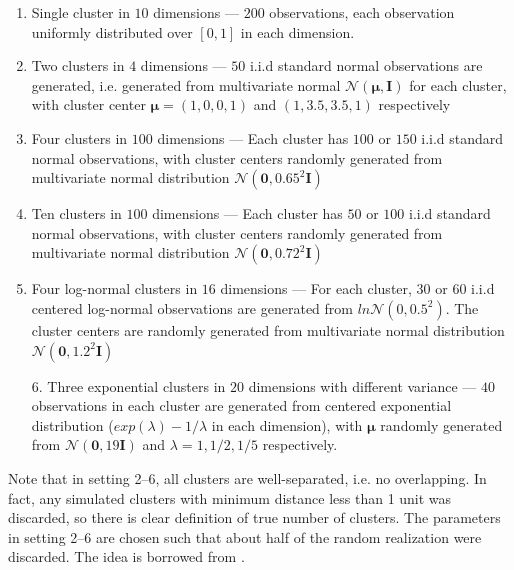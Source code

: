 \documentclass[11pt]{article}
\begin{document}
\begin{enumerate}

  \item Single cluster in $10$ dimensions --- $200$ observations, each
    observation uniformly distributed over $[0,1]$ in each dimension. 

  \item Two clusters in $4$ dimensions --- $50$ i.i.d standard normal
    observations are generated, i.e. generated from multivariate normal
    $\mathcal{N}\left(\boldsymbol\mu,\mathbf{I}\right)$ for each cluster, with
    cluster center $\boldsymbol\mu = (1,0,0,1)$ and $(1,3.5,3.5,1)$
    respectively  

  \item Four clusters in $100$ dimensions ---  Each cluster has $100$ or $150$
    i.i.d standard normal observations, with cluster centers randomly
    generated from multivariate normal distribution
    $\mathcal{N}\left(\mathbf{0},0.65^2\mathbf{I}\right)$

  \item Ten clusters in $100$ dimensions ---  Each cluster has $50$ or $100$
    i.i.d standard normal observations, with cluster centers randomly
    generated from multivariate normal distribution
    $\mathcal{N}\left(\mathbf{0},0.72^2\mathbf{I}\right)$

  \item Four log-normal clusters in $16$ dimensions --- For each cluster, $30$
    or $60$ i.i.d centered log-normal observations are generated from
    $ln\mathcal{N}\left(0,0.5^2 \right)$. The cluster centers are randomly
    generated from multivariate normal distribution
    $\mathcal{N}\left(\mathbf{0},1.2^2\mathbf{I}\right)$

  \item[6.] Three exponential clusters in $20$ dimensions with different
    variance --- $40$ observations in each cluster are generated from centered
    exponential distribution ($exp(\lambda)-1/\lambda$ in each dimension),
    with $\boldsymbol\mu$ randomly generated from
    $\mathcal{N}\left(\mathbf{0},19\mathbf{I}\right)$ and $\lambda = 1, 1/2,
    1/5$ respectively.
\end{enumerate}
Note that in setting 2--6, all clusters are well-separated, i.e. no
overlapping. In fact, any simulated clusters with minimum distance less than
1 unit was discarded, so there is clear definition of true number of
clusters. The parameters in setting 2--6 are chosen such that about half of
the random realization were discarded. The idea is borrowed from
\cite{tibshirani2001estimating}.
\end{document}
